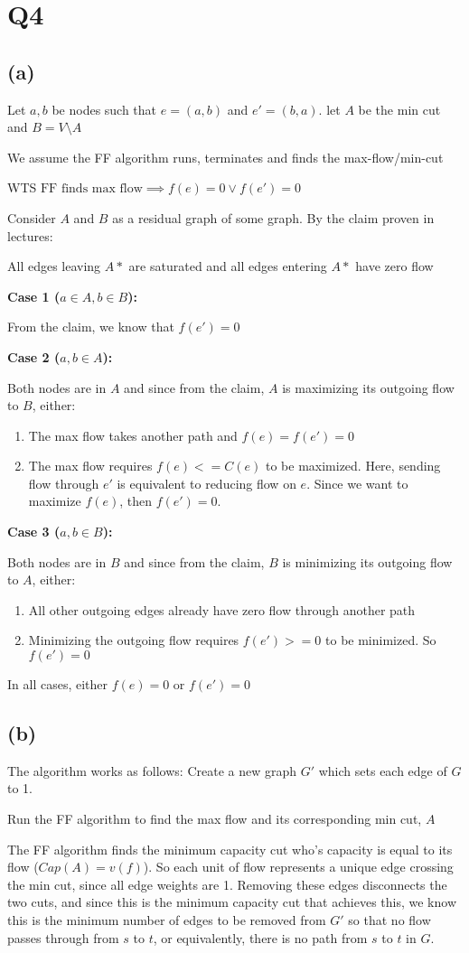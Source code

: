 \section*{Q4}

\subsection*{(a)}
Let $a,b$ be nodes such that $e = (a,b)$ and $e' = (b,a)$. let $A$ be the min cut and $B = V \setminus A$

We assume the FF algorithm runs, terminates and finds the max-flow/min-cut

WTS $\text{FF finds max flow} \implies f(e) = 0 \vee f(e') = 0$

Consider $A$ and $B$ as a residual graph of some graph. By the claim proven in lectures:

All edges leaving $A*$ are saturated and all edges entering $A*$ have zero flow

\textbf{Case 1 ($a \in A, b \in B$):}

From the claim, we know that $f(e') = 0$

\textbf{Case 2 ($a,b \in A$):}

Both nodes are in $A$ and since from the claim, $A$ is maximizing its outgoing flow to $B$, either:
\begin{enumerate}
    \item The max flow takes another path and $f(e)=f(e')=0$
    \item The max flow requires $f(e) <= C(e)$ to be maximized. Here, sending flow through $e'$ is equivalent to reducing flow on $e$. Since we want to maximize $f(e)$, then $f(e')=0$.
\end{enumerate}

\textbf{Case 3 ($a,b \in B$):}

Both nodes are in $B$ and since from the claim, $B$ is minimizing its outgoing flow to $A$, either:
\begin{enumerate}
    \item All other outgoing edges already have zero flow through another path
    \item Minimizing the outgoing flow requires $f(e')>=0$ to be minimized. So $f(e')=0$
\end{enumerate}

In all cases, either $f(e)=0$ or $f(e')=0$

\subsection*{(b)}
The algorithm works as follows:
Create a new graph $G'$ which sets each edge of $G$ to 1.

Run the FF algorithm to find the max flow and its corresponding min cut, $A$

The FF algorithm finds the minimum capacity cut who's capacity is equal to its flow ($Cap(A) = v(f)$). So each unit of flow represents a unique edge crossing the min cut, since all edge weights are 1. Removing these edges disconnects the two cuts, and since this is the minimum capacity cut that achieves this, we know this is the minimum number of edges to be removed from $G'$ so that no flow passes through from $s$ to $t$, or equivalently, there is no path from $s$ to $t$ in $G$.